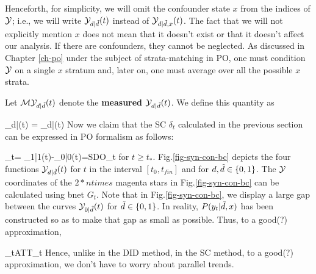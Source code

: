 Henceforth, 
for simplicity, we will
omit the confounder state $x$
from the indices of ${\cal Y}$; i.e., we will write
${\cal Y}_{d|{\tilde{d}}}(t)$
instead of ${\cal Y}_{d|{\tilde{d}}, x}(t)$.
The fact that we will
not explicitly
mention $x$ does not
mean that it doesn't exist
or that it doesn't affect our analysis.
If there are confounders,
they cannot be neglected.
As discussed in Chapter \ref{ch-po}
under the subject of strata-matching in PO,
one must condition ${\cal Y}$
on a single $x$ stratum
and, later on,  one must average
over all the possible $x$ strata.


Let ${\cal M}{\cal Y}_{d|{\tilde{d}}}(t)$ denote the
{\bf measured ${\cal Y}_{d|{\tilde{d}}}(t)$}.
We define this quantity as

\beq
\calm\caly_{d|\td}(t)
=
\caly_{d|\td}(t)
\left[ \indi(d=0, t< t_*)+
\indi(d=\td, t\geq t_*)\right]
\eeq
Now we claim that the SC 
$\delta_t$ calculated in the 
previous section 
can be expressed in PO formalism as follows:

\beqa
\delta_t=
\caly_{1|1}(t)-\caly_{0|0}(t)=SDO_t
\;
\eeqa
for $t\geq t_*$.
Fig.\ref{fig-syn-con-bc}
depicts the
four functions
${\cal Y}_{d|{\tilde{d}}}(t)$
for $t$ in the interval  $[t_0, t_{fin}]$
and for $d,{\tilde{d}}\in \{0,1\}$.
The ${\cal Y}$ coordinates
of the $2*ntimes$ magenta stars in 
Fig.\ref{fig-syn-con-bc} can 
be calculated using bnet $G_t$.
Note that in Fig.\ref{fig-syn-con-bc},
we display a large gap
between the curves ${\cal Y}_{0|{\tilde{d}}}(t)$
for ${\tilde{d}}\in \{0,1\}$.
In reality, $P(y_t|{\tilde{d}},x)$ has been
constructed so as to make that
gap as small as possible.
Thus, to a good(?) approximation,

\beq
\delta_t\approx ATT_t
\eeq
Hence, unlike in the DID method,
in the SC method, to a good(?)
approximation, we don't have to worry
about parallel trends.